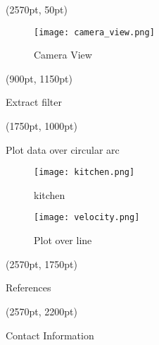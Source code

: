 \documentclass[final]{beamer}
\begin{document}
\begin{textblock*}{800pt}(2570pt, 50pt)
\begin{figure}
\texttt{[image: camera\_view.png]}
\caption{Camera View}
\end{figure}
\end{textblock*}

\begin{textblock*}{800pt}(900pt, 1150pt)
\begin{block}{Extract filter}
\end{block}
\end{textblock*}

\begin{textblock*}{800pt}(1750pt, 1000pt)
\begin{block}{Plot data over circular arc}
\begin{figure}
\texttt{[image: kitchen.png]}
\caption{kitchen}
\end{figure}
\begin{figure}
\texttt{[image: velocity.png]}
\caption{Plot over line}
\end{figure}
\end{block}
\end{textblock*}

\begin{textblock*}{800pt}(2570pt, 1750pt)
\begin{block}{References}
\end{block}
\end{textblock*}

\begin{textblock*}{800pt}(2570pt, 2200pt)
\begin{block}{Contact Information}
\end{block}
\end{textblock*}
\end{document}
